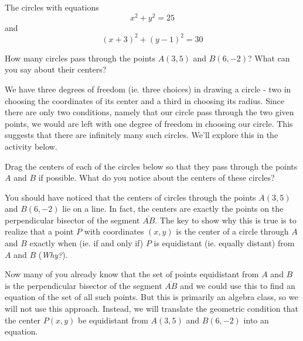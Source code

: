 \documentclass{ximera}
\begin{document}
\fi          %



\begin{example} \label{Ex4b}
The circles with equations
\[
    x^2 + y^2 = 25
\]
and 
\[
   (x+3)^2 + (y-1)^2=30
\]
\end{example}



\begin{example}  \label{Ex5}
How many circles pass through the points $A(3,5)$ and $B(6,-2)$? What can you say about their centers?
\end{example}

\begin{explanation}
We have three degrees of freedom (ie. three choices) in drawing a circle - two in choosing the coordinates of its center and a third in choosing its radius. Since there are only two conditions, namely that our circle pass through the two given points, we would are left with one degree of freedom in choosing our circle. This suggests that there are infinitely many such circles. We'll explore this in the activity below. 


\begin{exploration}\label{exp:circle1}
Drag the centers of each of the circles below so that they pass through the points $A$ and $B$ if possible. What do you notice about the centers of these circles?
 
 
\begin{onlineOnly}
    \begin{center}
\end{center}
\end{onlineOnly}
\end{exploration}

You should have noticed that the centers of circles through the points $A(3,5)$ and $B(6,-2)$ lie on a line. In fact, the centers are exactly the points on the perpendicular bisector of the segment $\overline{AB}$. The key to show why this is true is to realize that a point $P$ with coordinates $(x,y)$ is the center of a circle through $A$ and $B$ exactly when (ie. if and only if) $P$ is equidistant (ie. equally distant) from $A$ and $B$ (\emph{Why?}). 

Now many of you already know that the set of points equidistant from $A$ and $B$ is the perpendicular bisector of the segment $\overline{AB}$ and we could use this to find an equation of the set of all such points. But this is primarily an algebra class, so we will not use this approach. Instead, we will translate the geometric condition that the center $P(x,y)$ be equidistant from $A(3,5)$ and $B(6,-2)$ into an equation.


\end{explanation}
\end{document}
